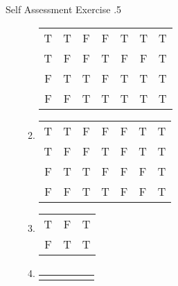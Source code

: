 \documentclass[\main/notes.tex]{subfiles}
\begin{document}
\begin{exercise}{Self Assessment Exercise \thechapter.5}
\begin{enumerate}
\begin{enumerate}
\begin{center}
\begin{tabular}{| c c | c c | c | c | c |}
										\hline
										T & T & F & F & T & T & T\\
										T & F & F & T & F & F & T\\
										F & T & T & F & T & T & T\\
										F & F & T & T & T & T & T\\
										\hline
									\end{tabular}
								\end{center}
							\item {}
								\begin{center}
									\begin{tabular}{|c c | c  c | c | c | c |}
										\hline
										\tablehead{$p$} & \tablehead{$q$} & \tablehead{$\lnot p$} & \tablehead{$\lnot q$} & \tablehead{$q \land \lnot q$} & \tablehead{$ \lnot p \rightarrow (q \land \lnot q)$} & \tablehead{$[\lnot p \rightarrow (q \land \lnot q)] \rightarrow p$}\\
										\hline
										T & T & F & F & F & T & T\\
										T & F & F & T & F & T & T\\
										F & T & T & F & F & F & T\\
										F & F & T & T & F & F & T\\
										\hline
									\end{tabular}
								\end{center}
							\item \question{$p \lor (\lnot p)$}
								\begin{center}
									\begin{tabular}{| c | c | c |}
										\hline
										\tablehead{$p$} & \tablehead{$\lnot p$} & \tablehead{$p \lor \lnot p$}\\
										\hline
										T & F & T\\
										F & T & T\\
										\hline
									\end{tabular}
								\end{center}
							\item \question{$\bigl[p \land (p \rightarrow q)\bigr] \rightarrow q$}
								\begin{center}
									\begin{tabular}{| c c | c | c | c |}
										\hline
										\tablehead{$p$} & \tablehead{$q$} & \tablehead{$p \rightarrow q$} & \tablehead{$p \land (p \rightarrow q)$} & \tablehead{$[p \land (p \rightarrow q)] \rightarrow q$}\\

\end{tabular}
\end{center}
\end{enumerate}
\end{enumerate}
\end{exercise}
\end{document}
